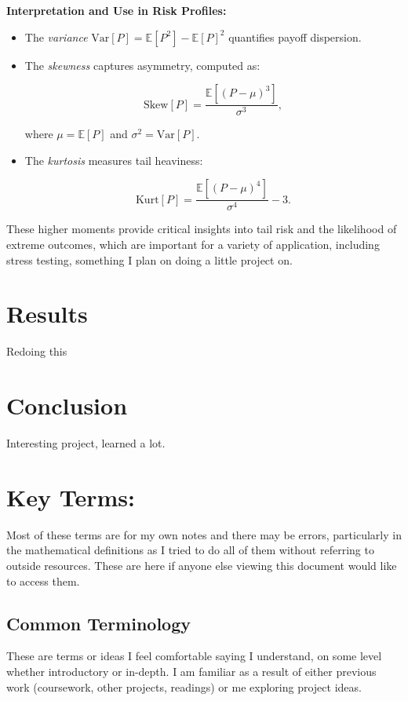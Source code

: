 \documentclass[titlepage]{article}
\begin{document}
\vspace{6pt}
\noindent \textbf{Interpretation and Use in Risk Profiles:}  
\begin{itemize}
\item The \emph{variance} \(\mathrm{Var}[P] = \mathbb{E}[P^2] - \mathbb{E}[P]^2\) quantifies payoff dispersion.
\item The \emph{skewness} captures asymmetry, computed as:

\[
\mathrm{Skew}[P] = \frac{\mathbb{E}[(P - \mu)^3]}{\sigma^3},
\]

where \(\mu = \mathbb{E}[P]\) and \(\sigma^2 = \mathrm{Var}[P]\).
\item The \emph{kurtosis} measures tail heaviness:

\[
\mathrm{Kurt}[P] = \frac{\mathbb{E}[(P - \mu)^4]}{\sigma^4} - 3.
\]
\end{itemize}
These higher moments provide critical insights into tail risk and the likelihood of extreme outcomes, which are important for a variety of application, including stress testing, something I plan on doing a little project on.

\section{Results}
Redoing this

\section{Conclusion}

Interesting project, learned a lot.

\section{Key Terms:}
Most of these terms are for my own notes and there may be errors, particularly in the mathematical definitions as I tried to do all of them without referring to outside resources. These are here if anyone else viewing this document would like to access them.

\subsection{Common Terminology}
These are terms or ideas I feel comfortable saying I understand, on some level whether introductory or in-depth. I am familiar as a result of either previous work (coursework, other projects, readings) or me exploring project ideas.
\end{document}
